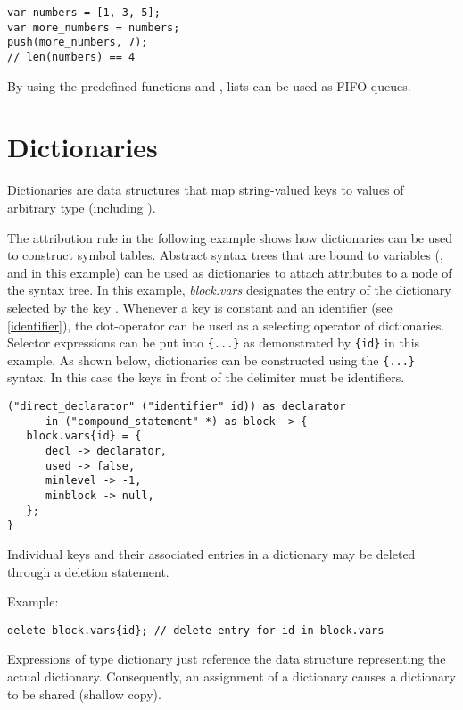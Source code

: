 \begin{lstlisting}
var numbers = [1, 3, 5];
var more_numbers = numbers;
push(more_numbers, 7);
// len(numbers) == 4
\end{lstlisting}

By using the predefined functions  and
, lists can be used as FIFO queues.

\section{Dictionaries}\label{dictionary}

Dictionaries are data structures that map string-valued keys
to values of arbitrary type (including ).

The attribution rule in the following example shows how dictionaries
can be used to construct symbol tables. Abstract syntax trees that are
bound to variables (,  and  in
this example) can be used as dictionaries to attach attributes to a node
of the syntax tree. In this example, \textit{block.vars} designates the
entry of the dictionary  selected by the key .
Whenever a key is constant and an identifier (see \ref{identifier}),
the dot-operator can be used as a selecting operator of dictionaries.
Selector expressions can be put into \lstinline!{...}! as demonstrated
by \lstinline!{id}! in this example. As shown below, dictionaries can be
constructed using the \lstinline!{...}! syntax. In this case the keys in
front of the \token{->} delimiter must be identifiers.

\begin{lstlisting}
("direct_declarator" ("identifier" id)) as declarator
      in ("compound_statement" *) as block -> {
   block.vars{id} = {
      decl -> declarator,
      used -> false,
      minlevel -> -1,
      minblock -> null,
   };
}
\end{lstlisting}

\noindent
Individual keys and their associated entries in a dictionary
may be deleted through a deletion statement.

\bigskip
\noindent
Example:

\begin{lstlisting}
delete block.vars{id}; // delete entry for id in block.vars
\end{lstlisting}

\noindent
Expressions of type dictionary just reference the data structure
representing the actual dictionary. Consequently, an assignment of a
dictionary causes a dictionary to be shared
(shallow copy).

